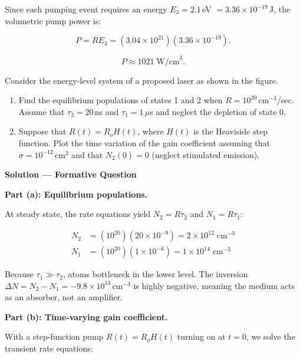 Since each pumping event requires an energy $E_3 = 2.1$\,eV $= 3.36\times10^{-19}$\,J, the volumetric pump power is:

\begin{equation*}
  P = R E_3 = (3.04\times10^{21})(3.36\times10^{-19}).
\end{equation*}

\begin{equation*}
  \boxed{P \approx 1021\;\text{W/cm}^{3}.}
\end{equation*}


\begin{question}Consider the energy-level system of a proposed laser
as shown in the figure.
\begin{enumerate}[label=(\alph*)]
  \item Find the equilibrium populations of states 1 and 2 when $R=10^{20}$\,cm$^{-3}$/sec.
        Assume that $\tau_{2}=20$\,ns and $\tau_{1}=1\,\mu$s and neglect the depletion of
        state 0.
  \item Suppose that $R(t)=R_{o}H(t)$, where $H(t)$ is the Heaviside step function. Plot the
        time variation of the gain coefficient assuming that $\sigma=10^{-12}$\,cm$^{2}$ and
        that $N_{2}(0)=0$ (neglect stimulated emission).
\end{enumerate}
\end{question}

\textbf{\large Solution --- Formative Question}

\textbf{Part (a): Equilibrium populations.}

At steady state, the rate equations yield $N_2 = R\tau_2$ and $N_1 = R\tau_1$:

\begin{align*}
  N_2 &= (10^{20})(20\times10^{-9}) = 2\times10^{12}\;\text{cm}^{-3} \\[1ex]
  N_1 &= (10^{20})(1\times10^{-6}) = 1\times10^{14}\;\text{cm}^{-3}
\end{align*}

Because $\tau_1 \gg \tau_2$, atoms bottleneck in the lower level. The inversion $\Delta N = N_2 - N_1 = -9.8\times10^{13}$\,cm$^{-3}$ is highly negative, meaning the medium acts as an absorber, not an amplifier.

\textbf{Part (b): Time-varying gain coefficient.}

With a step-function pump $R(t) = R_o H(t)$ turning on at $t=0$, we solve the transient rate equations:

